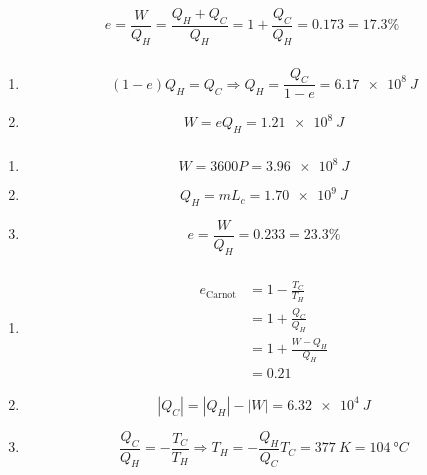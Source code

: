 \documentclass{article}
\begin{document}
\[e = \frac{W}{Q_H} = \frac{Q_H + Q_C}{Q_H} = 1 + \frac{Q_C}{Q_H} = 0.173 = 17.3\%\]

\subsubsection{}

\begin{enumerate}
  \item \[(1 - e) Q_H = Q_C \Rightarrow Q_H = \frac{Q_C}{1 - e} = \qty{6.17e8}{J}\]

  \item \[W = e Q_H = \qty{1.21e8}{J}\]
\end{enumerate}

\subsubsection{}

\begin{enumerate}
  \item \[W = 3600 P = \qty{3.96e8}{J}\]

  \item \[Q_H = m L_c = \qty{1.70e9}{J}\]

  \item \[e = \frac{W}{Q_H} = 0.233 = 23.3\%\]
\end{enumerate}

\subsubsection{}

\begin{enumerate}
  \item

        \begin{align*}
          e_\text{Carnot} & = 1 - \frac{T_C}{T_H}     \\
                          & = 1 + \frac{Q_C}{Q_H}     \\
                          & = 1 + \frac{W - Q_H}{Q_H} \\
                          & = 0.21
        \end{align*}

  \item \[|Q_C| = |Q_H| - |W| = \qty{6.32e4}{J}\]

  \item \[\frac{Q_C}{Q_H} = -\frac{T_C}{T_H} \Rightarrow T_H = -\frac{Q_H}{Q_C} T_C = \qty{377}{K} = \qty{104}{\degree C}\]
\end{enumerate}
\end{document}
